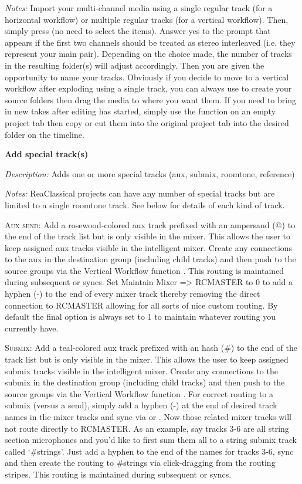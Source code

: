 \documentclass[10pt,american]{article}
\begin{document}
\emph{Notes:} Import your multi-channel media using a single regular track (for
a horizontal workflow) or multiple regular tracks (for a vertical workflow).
Then, simply press  (no need to select the items). Answer yes to the
prompt that appears if the first two channels should be treated as stereo
interleaved (i.e. they represent your main pair). Depending on the choice made,
the number of tracks in the resulting folder(s) will adjust accordingly. Then
you are given the opportunity to name your tracks. Obviously if you decide to
move to a vertical workflow after exploding using a single track, you can always
use  to create your source folders then drag the media to where you
want them. If you need to bring in new takes after editing has started, simply
use the function on an empty project tab then copy or cut them into the original
project tab into the desired folder on the timeline.

\textbf{Add special track(s) }\keys{\#}

\emph{Description: }Adds one or more special tracks (aux, submix, roomtone,
reference)

\emph{Notes: }ReaClassical projects can have any number of special tracks but
are limited to a single roomtone track. See below for details of each kind of
track.

\textsc{Aux send}: Add a rosewood-colored aux track prefixed with an ampersand
(@) to the end of the track list but is only visible in the mixer. This allows
the user to keep assigned aux tracks visible in the intelligent mixer. Create
any connections to the aux in the destination group (including child tracks) and
then push to the source groups via the Vertical Workflow function  .
This routing is maintained during subsequent  or  syncs. Set
\textquotedbl Maintain Mixer => RCMASTER\textquotedbl{} to 0 to add a hyphen (-)
to the end of every mixer track thereby removing the direct connection to
RCMASTER allowing for all sorts of nice custom routing. By default the final
option is always set to 1 to maintain whatever routing you currently have.

\textsc{Submix}: Add a teal-colored aux track prefixed with an hash (\#) to the
end of the track list but is only visible in the mixer. This allows the user to
keep assigned submix tracks visible in the intelligent mixer. Create any
connections to the submix in the destination group (including child tracks) and
then push to the source groups via the Vertical Workflow function  .
For correct routing to a submix (versus a send), simply add a hyphen (-) at the
end of desired track names in the mixer tracks and sync via  or
. Now those related mixer tracks will not route directly to RCMASTER.
As an example, say tracks 3-6 are all string section microphones and you'd like
to first sum them all to a string submix track called `\#strings'. Just add a
hyphen to the end of the names for tracks 3-6, sync and then create the routing
to \#strings via click-dragging from the routing stripes. This routing is
maintained during subsequent  or  syncs.
\end{document}
